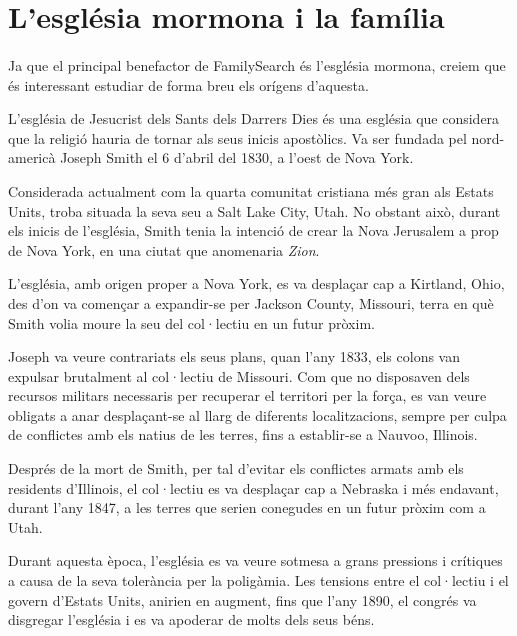 \section{L'església mormona i la família}

    \paragraph{}
    Ja que el principal benefactor de FamilySearch és l'església mormona, creiem que és interessant estudiar de forma breu els orígens d'aquesta.

    L’església de Jesucrist dels Sants dels Darrers Dies és una església que considera que la religió hauria de tornar als seus inicis apostòlics. Va ser fundada pel nord-americà Joseph Smith el 6 d’abril del 1830, a l'oest de Nova York.

    Considerada actualment com la quarta comunitat cristiana més gran als Estats Units, troba situada la seva seu a Salt Lake City, Utah. No obstant això, durant els inicis de l’església, Smith tenia la intenció de crear la Nova Jerusalem a prop de Nova York, en una ciutat que anomenaria \emph{Zion}.

    L’església, amb origen proper a Nova York, es va desplaçar cap a Kirtland, Ohio, des d'on va començar a expandir-se per Jackson County, Missouri, terra en què Smith volia moure la seu del col·lectiu en un futur pròxim.

    Joseph va veure contrariats els seus plans, quan l'any 1833, els colons van expulsar brutalment al col·lectiu de Missouri. Com que no disposaven dels recursos militars necessaris per recuperar el territori per la força, es van veure obligats a anar desplaçant-se al llarg de diferents localitzacions, sempre per culpa de conflictes amb els natius de les terres, fins a establir-se a Nauvoo, Illinois.

    Després de la mort de Smith, per tal d'evitar els conflictes armats amb els residents d'Illinois, el col·lectiu es va desplaçar cap a Nebraska i més endavant, durant l'any 1847, a les terres que serien conegudes en un futur pròxim com a Utah.

    Durant aquesta època, l'església es va veure sotmesa a grans pressions i crítiques a causa de la seva tolerància per la poligàmia. Les tensions entre el col·lectiu i el govern d'Estats Units, anirien en augment, fins que l'any 1890, el congrés va disgregar l'església i es va apoderar de molts dels seus béns.

